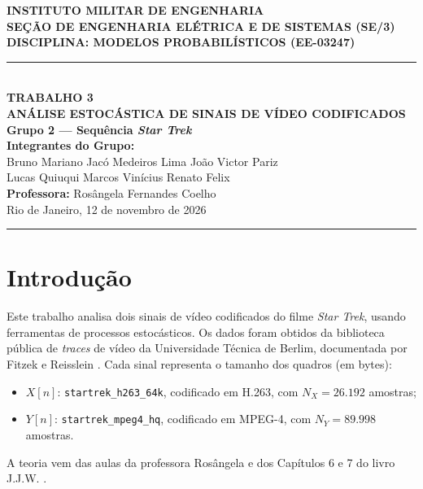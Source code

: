 \documentclass[11pt,a4paper]{article}
\begin{document}
\begin{center}
    {\large \textbf{INSTITUTO MILITAR DE ENGENHARIA}}\\[1mm]
    {\normalsize \textbf{SEÇÃO DE ENGENHARIA ELÉTRICA E DE SISTEMAS (SE/3)}}\\[1mm]
    {\normalsize \textbf{DISCIPLINA: MODELOS PROBABILÍSTICOS (EE-03247)}}\\[3mm]
    \rule{\textwidth}{0.8pt}\\[2.5mm]
    {\Large \textbf{TRABALHO 3}}\\[1.5mm]
    {\large \textbf{ANÁLISE ESTOCÁSTICA DE SINAIS DE VÍDEO CODIFICADOS}}\\[1.5mm]
    {\normalsize \textbf{Grupo 2 — Sequência \textit{Star Trek}}}\\[2.5mm]
    {\normalsize \textbf{Integrantes do Grupo:}}\\[1mm]
    {\normalsize Bruno Mariano \quad Jacó Medeiros Lima \quad João Victor Pariz}\\[1mm]
    {\normalsize Lucas Quiuqui \quad Marcos Vinícius \quad Renato Felix}\\[2mm]
    {\normalsize \textbf{Professora:} Rosângela Fernandes Coelho}\\[1mm]
    {\small Rio de Janeiro, 12 de novembro de 2026}\\[1.5mm]
    \rule{\textwidth}{0.8pt}
\end{center}

\section*{Introdução}

Este trabalho analisa dois sinais de vídeo codificados do filme \textit{Star Trek}, usando ferramentas de processos estocásticos. Os dados foram obtidos da biblioteca pública de \textit{traces} de vídeo da Universidade Técnica de Berlim, documentada por Fitzek e Reisslein \cite{Fitzek}. Cada sinal representa o tamanho dos quadros (em bytes):
\begin{itemize}[leftmargin=*, nosep]
    \item $X[n]$: \texttt{startrek\_h263\_64k}, codificado em H.263, com $N_X = 26.192$ amostras;
    \item $Y[n]$: \texttt{startrek\_mpeg4\_hq}, codificado em MPEG-4, com $N_Y = 89.998$ amostras.
\end{itemize}
A teoria vem das aulas da professora Rosângela e dos Capítulos 6 e 7 do livro J.J.W. \cite{JJW}.

\end{document}
